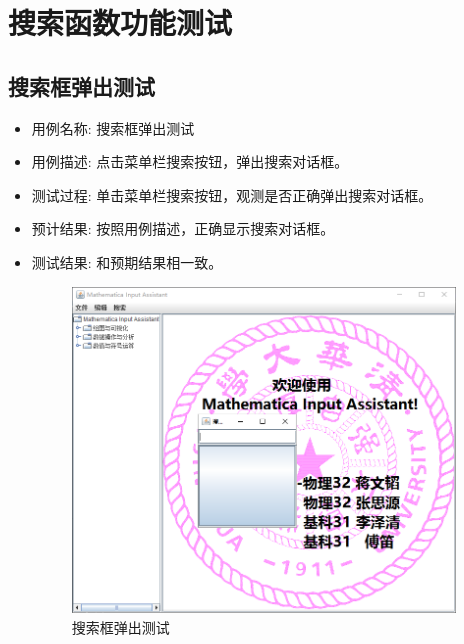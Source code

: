 \documentclass[hyperref, UTF8
,bookmarksnumbered=true, oneside]{ctexbook}
\begin{document}

	\section{搜索函数功能测试} %
		\subsection{搜索框弹出测试} %
		\begin{itemize}
			\item 用例名称: 搜索框弹出测试
			\item 用例描述: 点击菜单栏搜索按钮，弹出搜索对话框。
			\item 测试过程: 单击菜单栏搜索按钮，观测是否正确弹出搜索对话框。
			\item 预计结果: 按照用例描述，正确显示搜索对话框。
			\item 测试结果:	和预期结果相一致。

				\begin{figure}[!h]
                	\centering
                	\includegraphics[width=4in]{17.png}
                	\caption{搜索框弹出测试}    
                	\label{pic:MathObject}
            	\end{figure}

		\end{itemize}
\end{document}
